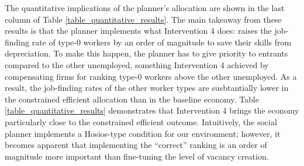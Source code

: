 \documentclass[12pt]{article} %
\theoremstyle{definition}
\begin{document}
The quantitative implications of the planner's allocation are shown in the last column of Table \ref{table_quantitative_results}.
The main takeaway from these results is that the planner implements what Intervention 4 does: raises the job-finding rate of type-0 workers by an order of magnitude to save their skills from depreciation.
To make this happen, the planner has to give priority to entrants compared to the other unemployed, something Intervention 4 achieved by compensating firms for ranking type-0 workers above the other unemployed.
As a result, the job-finding rates of the other worker types are susbtantially lower in the constrained efficient allocation than in the baseline economy.
Table \ref{table_quantitative_results} demonstrates that Intervention 4 brings the economy particularly close to the constrained efficient outcome. 
Intuitively, the social planner implements a Hosios-type condition for our environment; however, it becomes apparent that implementing the ``correct'' ranking is an order of magnitude more important than fine-tuning the level of vacancy creation.
\end{document}
